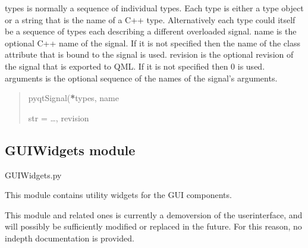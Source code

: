 \documentclass[letterpaper,10pt,english]{sphinxmanual}
\begin{document}
\begin{fulllineitems}
\begin{fulllineitems}
\sphinxAtStartPar
types is normally a sequence of individual types.  Each type is either a
type object or a string that is the name of a C++ type.  Alternatively
each type could itself be a sequence of types each describing a different
overloaded signal.
name is the optional C++ name of the signal.  If it is not specified then
the name of the class attribute that is bound to the signal is used.
revision is the optional revision of the signal that is exported to QML.
If it is not specified then 0 is used.
arguments is the optional sequence of the names of the signal’s arguments.
\begin{quote}\begin{description}
\sphinxAtStartPar
pyqtSignal({\color{red}\bfseries{}*}types, name

\sphinxAtStartPar
str = …, revision

\end{description}\end{quote}

\end{fulllineitems}


\end{fulllineitems}


\sphinxstepscope


\subsection{GUIWidgets module}
\label{\detokenize{source/GUIWidgets:module-GUIWidgets}}\label{\detokenize{source/GUIWidgets:guiwidgets-module}}\label{\detokenize{source/GUIWidgets::doc}}
\sphinxAtStartPar
GUIWidgets.py

\sphinxAtStartPar
This module contains utility widgets for the GUI components.

\sphinxAtStartPar
This module and related ones is currently a demo\sphinxhyphen{}version of the user\sphinxhyphen{}interface, and will
possibly be sufficiently modified or replaced in the future. For this reason, no in\sphinxhyphen{}depth
documentation is provided.

\end{document}

